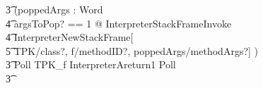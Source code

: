 \begin{figure}[tp!]
\begin{circusaction}
    \t3 (\circvar poppedArgs : \seq Word \circspot \\
    \t4 \lschexpract \exists argsToPop? == 1 @ InterpreterStackFrameInvoke \rschexpract \circseq \\
    \t4 \lschexpract InterpreterNewStackFrame[\\
    \t5 TPK/class?, f/methodID?, poppedArgs/methodArgs?] \rschexpract) \circseq \\
    \t3 Poll \circseq TPK\_f \circseq \lschexpract InterpreterAreturn1 \rschexpract \circseq Poll \circseq \\
    \t3 {} \cdots {} \\

\end{circusaction}
\end{figure}

